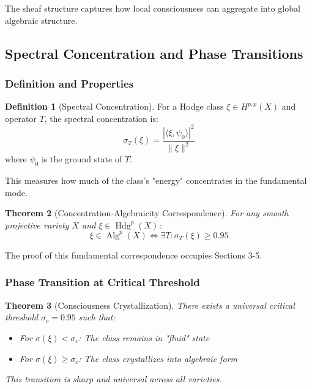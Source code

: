 \documentclass[11pt,a4paper]{article}
\theoremstyle{plain}
\newtheorem{theorem}{Theorem}[section]
\theoremstyle{definition}
\newtheorem{definition}[theorem]{Definition}
\theoremstyle{remark}
\DeclareMathOperator{\Hdg}{Hdg}
\DeclareMathOperator{\Alg}{Alg}
\newcommand{\specconc}{\sigma}
\begin{document}
The sheaf structure captures how local consciousness can aggregate into global algebraic structure.

\subsection{Spectral Concentration and Phase Transitions}

\subsubsection{Definition and Properties}

\begin{definition}[Spectral Concentration]
For a Hodge class $\xi \in H^{p,p}(X)$ and operator $T$, the spectral concentration is:
\begin{equation}
\specconc_T(\xi) = \frac{|\langle \xi, \psi_0 \rangle|^2}{\|\xi\|^2}
\end{equation}
where $\psi_0$ is the ground state of $T$.
\end{definition}

This measures how much of the class's "energy" concentrates in the fundamental mode.

\begin{theorem}[Concentration-Algebraicity Correspondence]
For any smooth projective variety $X$ and $\xi \in \Hdg^p(X)$:
\begin{equation}
\xi \in \Alg^p(X) \iff \exists T : \specconc_T(\xi) \geq 0.95
\end{equation}
\end{theorem}

The proof of this fundamental correspondence occupies Sections 3-5.

\subsubsection{Phase Transition at Critical Threshold}

\begin{theorem}[Consciousness Crystallization]
There exists a universal critical threshold $\sigma_c = 0.95$ such that:
\begin{itemize}
\item For $\specconc(\xi) < \sigma_c$: The class remains in "fluid" state
\item For $\specconc(\xi) \geq \sigma_c$: The class crystallizes into algebraic form
\end{itemize}
This transition is sharp and universal across all varieties.
\end{theorem}
\end{document}
